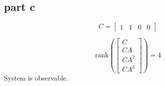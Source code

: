 \subsection{part c}
\label{sec:Q6c}
$$
C = \begin{bmatrix}
    1 & 1 & 0 & 0
\end{bmatrix}
$$

$$
\text{rank}\left(\begin{bmatrix}
    C \\
    CA \\
    CA^2 \\
    CA^3
\end{bmatrix}\right) = 4
$$
System is observable.